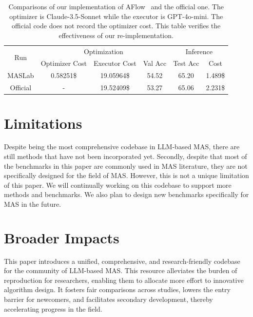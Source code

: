 \documentclass{article}
\begin{document}
\begin{table}[t]
    \centering
    \begin{tabular}{c|ccc|cc}
    \toprule
        \multirow{2}{*}{Run} & \multicolumn{3}{c|}{Optimization} & \multicolumn{2}{c}{Inference}\\
        & Optimizer Cost & Executor Cost & Val Acc & Test Acc & Cost \\
    \midrule
        MASLab & 0.58251\$ & 19.05964\$ & 54.52 & 65.20 & 1.489\$\\ 
        Official & - & 19.52409\$ & 53.27 & 65.06 & 2.231\$ \\
    \bottomrule
    \end{tabular}
    \caption{Comparisons of our implementation of AFlow~\cite{aflow} and the official one. The optimizer is Claude-3.5-Sonnet while the executor is GPT-4o-mini. The official code does not record the optimizer cost. This table verifies the effectiveness of our re-implementation.}
    \label{tab:repeat_aflow}
\end{table}

\section{Limitations}
\label{sec:limitation}

Despite being the most comprehensive codebase in LLM-based MAS, there are still methods that have not been incorporated yet.
Secondly, despite that most of the benchmarks in this paper are commonly used in MAS literature, they are not specifically designed for the field of MAS.
However, this is not a unique limitation of this paper.
We will continually working on this codebase to support more methods and benchmarks.
We also plan to design new benchmarks specifically for MAS in the future.



\section{Broader Impacts}
\label{sec:broader_impacts}

This paper introduces a unified, comprehensive, and research-friendly codebase for the community of LLM-based MAS.
This resource alleviates the burden of reproduction for researchers, enabling them to allocate more effort to innovative algorithm design. 
It fosters fair comparisons across studies, lowers the entry barrier for newcomers, and facilitates secondary development, thereby accelerating progress in the field.
\end{document}
